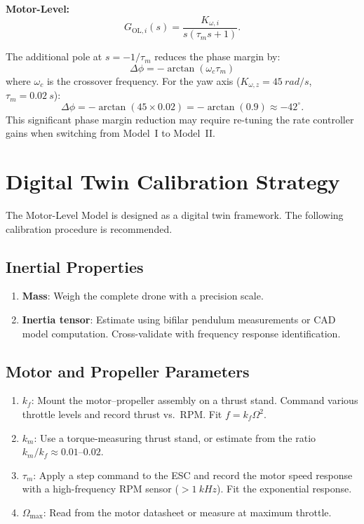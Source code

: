 \documentclass[journal]{IEEEtran}
\begin{document}
\textbf{Motor-Level:}
\begin{equation}
  G_{\text{OL},i}(s) = \frac{K_{\omega,i}}{s(\tau_m s + 1)}.
  \label{eq:gol_motor}
\end{equation}

The additional pole at $s = -1/\tau_m$ reduces the phase margin by:
\begin{equation}
  \Delta \phi = -\arctan(\omega_c \tau_m)
  \label{eq:phase_loss}
\end{equation}
where $\omega_c$ is the crossover frequency. For the yaw axis ($K_{\omega,z} = \SI{45}{rad/s}$, $\tau_m = \SI{0.02}{s}$):
\begin{equation}
  \Delta \phi = -\arctan(45 \times 0.02) = -\arctan(0.9) \approx -42^\circ.
  \label{eq:phase_loss_yaw}
\end{equation}
This significant phase margin reduction may require re-tuning the rate controller gains when switching from Model~I to Model~II.


\section{Digital Twin Calibration Strategy}
\label{sec:calibration}

The Motor-Level Model is designed as a digital twin framework. The following calibration procedure is recommended.

\subsection{Inertial Properties}

\begin{enumerate}
  \item \textbf{Mass}: Weigh the complete drone with a precision scale.
  \item \textbf{Inertia tensor}: Estimate using bifilar pendulum measurements or CAD model computation. Cross-validate with frequency response identification.
\end{enumerate}

\subsection{Motor and Propeller Parameters}

\begin{enumerate}
  \item \textbf{$k_f$}: Mount the motor--propeller assembly on a thrust stand. Command various throttle levels and record thrust vs.\ RPM. Fit $f = k_f \Omega^2$.
  \item \textbf{$k_m$}: Use a torque-measuring thrust stand, or estimate from the ratio $k_m/k_f \approx 0.01$--$0.02$.
  \item \textbf{$\tau_m$}: Apply a step command to the ESC and record the motor speed response with a high-frequency RPM sensor ($>\SI{1}{kHz}$). Fit the exponential response.
  \item \textbf{$\Omega_{\max}$}: Read from the motor datasheet or measure at maximum throttle.
\end{enumerate}
\end{document}
